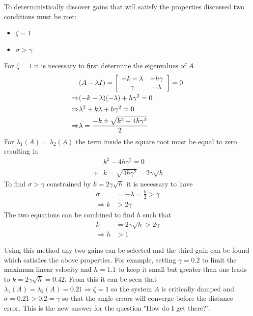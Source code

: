 To deterministically discover gains that will satisfy the properties discussed two conditions must be met:
\begin{itemize}
\item $\zeta = 1$
\item $\sigma > \gamma$
\end{itemize}
For $\zeta=1$ it is necessary to first determine the eigenvalues of $A$.
\begin{align*}
&(A-\lambda I) = \left[\begin{array}{c c} -k-\lambda & -h\gamma \\ \gamma & -\lambda\end{array}\right] = 0 \\
\Rightarrow &(-k-\lambda)(-\lambda)+h\gamma^2 = 0 \\
\Rightarrow &\lambda^2 + k\lambda + h\gamma^2 = 0 \\
\Rightarrow &\lambda = \frac{-k\pm\sqrt{k^2-4h\gamma^2}}{2}
\end{align*}
For $\lambda_1(A)=\lambda_2(A)$ the term inside the square root must be equal to zero resulting in
\begin{align*}
&k^2 - 4h\gamma^2 = 0 \\
\Rightarrow &k = \sqrt{4h\gamma^2} = 2\gamma\sqrt{h}
\end{align*}
To find $\sigma>\gamma$ constrained by $k=2\gamma\sqrt{h}$ it is necessary to have
\begin{align*}
\sigma &= -\lambda = \tfrac{k}{2} > \gamma \\
\Rightarrow k &> 2\gamma
\end{align*}
The two equations can be combined to find $h$ such that
\begin{align*}
k &= 2\gamma\sqrt{h} > 2\gamma \\
\Rightarrow h &> 1
\end{align*}

Using this method any two gains can be selected and the third gain can be found which satisfies the above properties. For example, setting $\gamma=0.2$ to limit the maximum linear velocity and $h=1.1$ to keep it small but greater than one leads to $k=2\gamma\sqrt{h}=0.42$. From this it can be seen that $\lambda_1(A) = \lambda_2(A) = 0.21 \Rightarrow \zeta = 1$ so the system $A$ is critically damped and $\sigma = 0.21>0.2=\gamma$ so that the angle errors will converge before the distance error. This is the new answer for the question "How do I get there?".
